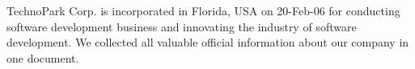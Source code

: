 
TechnoPark Corp. is incorporated in Florida, USA on 20-Feb-06 for
conducting software development business and innovating the industry
of software development. We collected all valuable official information
about our company in one document.
